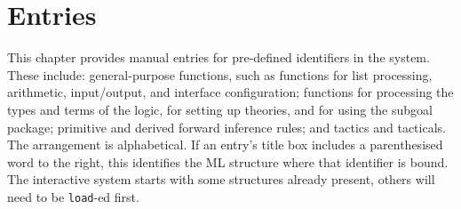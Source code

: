 \chapter{Entries}

This chapter provides manual entries for pre-defined \ML{} identifiers
in the \HOL{} system.  These include: general-purpose functions, such
as functions for list processing, arithmetic, input/output, and
interface configuration; functions for processing the types and terms
of the \HOL{} logic, for setting up theories, and for using the
subgoal package; primitive and derived forward inference rules; and
tactics and tacticals.  The arrangement is alphabetical.  If an
entry's title box includes a parenthesised word to the right, this
identifies the ML structure where that identifier is bound.
The interactive system starts with some structures already present,
others will need to be \texttt{load}-ed first.

